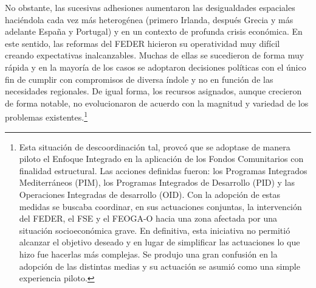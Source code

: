 \documentclass[10pt,a4paper]{article}
\begin{document}
No obstante, las sucesivas adhesiones aumentaron las desigualdades espaciales haciéndola cada vez más heterogénea (primero Irlanda, después Grecia y más adelante España y Portugal) y en un contexto de profunda crisis económica. En este sentido, las reformas del FEDER hicieron su operatividad muy difícil creando expectativas inalcanzables. Muchas de ellas se sucedieron de forma muy rápida y en la mayoría de los casos se adoptaron decisiones políticas con el único fin de cumplir con compromisos de diversa índole y no en función de las necesidades regionales. De igual forma, los recursos asignados, aunque crecieron de forma notable, no evolucionaron de acuerdo con la magnitud y variedad de los problemas existentes.\footnote{%
    Esta situación de descoordinación tal, provcó que se adoptase de manera piloto el Enfoque Integrado en la aplicación de los Fondos Comunitarios con finalidad estructural. Las acciones definidas fueron: los Programas Integrados Mediterráneos (PIM), los Programas Integrados de Desarrollo (PID) y las Operaciones Integradas de desarrollo (OID). Con la adopción de estas medidas se buscaba coordinar, en sus actuaciones conjuntas, la intervención del FEDER, el FSE y el FEOGA-O hacia una zona afectada por una situación socioeconómica grave. En definitiva, esta iniciativa no permitió alcanzar el objetivo deseado y en lugar de simplificar las actuaciones lo que hizo fue hacerlas más complejas. Se produjo una gran confusión en la adopción de las distintas  medias y su actuación se asumió como una simple experiencia piloto.
}
\end{document}
